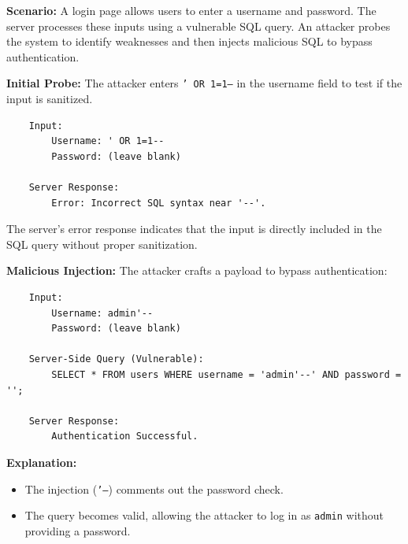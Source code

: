    
\newpage
\begin{Example}
    \textbf{Scenario:}
    A login page allows users to enter a username and password. The server processes these inputs using a vulnerable SQL query. An attacker probes the system to identify weaknesses and then injects malicious SQL to bypass authentication.
    
    \textbf{Initial Probe:} The attacker enters \texttt{' OR 1=1--} in the username field to test if the input is sanitized.
    \begin{verbatim}
    Input:
        Username: ' OR 1=1--
        Password: (leave blank)
    
    Server Response:
        Error: Incorrect SQL syntax near '--'.
    \end{verbatim}
    
    \noindent The server's error response indicates that the input is directly included in the SQL query without proper sanitization.
    
    \textbf{Malicious Injection:} The attacker crafts a payload to bypass authentication:
    \begin{verbatim}
    Input:
        Username: admin'--
        Password: (leave blank)
    
    Server-Side Query (Vulnerable):
        SELECT * FROM users WHERE username = 'admin'--' AND password = '';
    
    Server Response:
        Authentication Successful.
    \end{verbatim}
    
    \textbf{Explanation:}
    \begin{itemize}
        \item The injection (\texttt{'--}) comments out the password check.
        \item The query becomes valid, allowing the attacker to log in as \texttt{admin} without providing a password.
    \end{itemize}
\end{Example}

\newpage 

